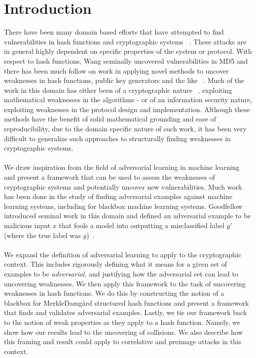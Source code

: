 \documentclass[letterpaper,twocolumn,10pt]{article}
\begin{document}
\section{Introduction}
There have been many domain based efforts that have attempted to find vulnerabilities in hash functions and cryptographic systems ~\cite{wang2005efficient, den1993collisions, heninger2009reconstructing, stevens2012attacks,  den1991attack, kelsey1998cryptanalytic, wang2005finding, bogdanov2011biclique}. These attacks are in general highly dependent on specific properties of the system or protocol. With respect to hash functions, Wang seminally uncovered vulnerabilities in MD5 and there has been much follow on work in applying novel methods to uncover weaknesses in hash functions, public key generators and the like ~\cite{wang2005break, gutterman2006analysis, yilek2009private}. Much of the work in this domain has either been of a cryptographic nature ~\cite{wang2005cryptanalysis, de2006finding}, exploiting mathematical weaknesses in the algorithms - or of an information security nature, exploiting weaknesses in the protocol design and implementation. Although these methods have the benefit of solid mathematical grounding and ease of reproducibility, due to the domain specific nature of such work, it has been very difficult to generalize such approaches to structurally finding weaknesses in cryptographic systems. 
\\
\\
We draw inspiration from the field of adversarial learning in machine learning and present a framework that can be used to assess the weaknesses of cryptographic systems and potentially uncover new vulnerabilities. Much work has been done in the study of finding adversarial examples against machine learning systems, including for blackbox machine learning systems. Goodfellow introduced seminal work in this domain and defined an adversarial example to be malicious input $x$ that fools a model into outputting a misclassified label $y'$ (where the true label was $y$)~\cite{goodfellow2014generative, kurakin2016adversarial}. 
\\
\\
We expand the definition of adversarial learning to apply to the cryptographic context. This includes rigorously defining what it means for a given set of examples to be \emph{adversarial}, and justifying how the adversarial set can lead to uncovering weaknesses. We then apply this framework to the task of uncovering weaknesses in hash functions. We do this by constructing the notion of a blackbox for Merkle{\textendash}Damg\r{a}rd structured hash functions and present a framework that finds and validates adversarial examples. Lastly, we tie our framework back to the notion of weak properties as they apply to a hash function. Namely, we show how our results lead to the uncovering of collisions. We also describe how this framing and result could apply to correlative and preimage attacks in this context.
\end{document}
